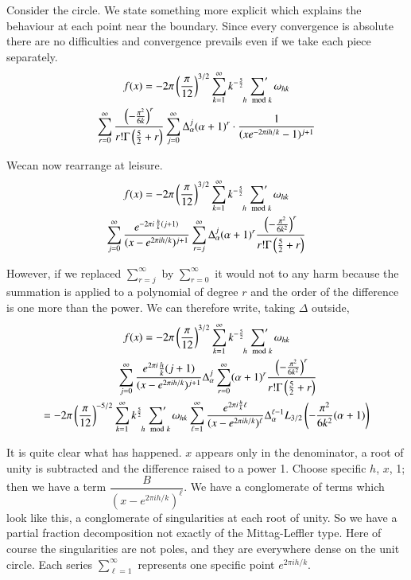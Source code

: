 Consider the circle. We state something more explicit which explains
the behaviour at each point near the boundary. Since every convergence
is absolute there are no difficulties and convergence prevails even if
we take each piece separately. 
\begin{multline*}
  f(x) =- 2 \pi \left( \frac{\pi}{12}\right)^{3/2} \sum^\infty_{k=1}
  k^{-\frac{5}{2}} \sideset{}{'}\sum_{h \mod k} \omega_{hk} \\
  \sum^\infty_{r=0} \frac{\left(- \frac{\pi^2}{6k} \right)^r}{r!
    \Gamma \left( \frac{5}{2}+ r\right)} \sum^\infty_{j=0}
  \Delta_\alpha^j (\alpha+1)^r \cdot \frac{1}{(x e^{-2 \pi i h/k}-1)^{j+1}}
\end{multline*}

We\pageoriginale can now rearrange at leisure.
\begin{multline*}
  f(x) =- 2 \pi \left( \frac{\pi}{12}\right)^{3/2} \sum^\infty_{k=1}
  k^{-\frac{5}{2}} \sideset{}{'}\sum_{h \mod k} \omega_{hk} \\
  \sum^\infty_{j=0} \frac{e^{-2 \pi i \, \frac{h}{k}(j+1)}}{(x-e^{2 \pi i
      h/k})^{j+1}} \sum^\infty_{r=j} \Delta^j_\alpha (\alpha+ 1)^r
  \frac{\left( - \frac{\pi^2}{6k^2}\right)^r}{r! \Gamma \left(
    \frac{5}{2} + r\right)} 
\end{multline*}

However, if we replaced $\sum^\infty_{r=j}$ by $\sum^\infty_{r=0}$
it would not to any harm because the summation is applied to a
polynomial of degree $r$ and the order of the difference is one more
than the power. We can therefore write, taking $\Delta$ outside, 
\begin{multline*}
  f (x)  = - 2 \pi \left(\frac{\pi}{12}\right)^{3/2} \sum^\infty_{k=1}
  k^{-\frac{5}{2}} \sideset{}{'}\sum_{h \mod k} \omega_{hk} \\
   \qquad\sum^\infty_{j=0} \frac{e^{2 \pi i} \frac{h}{k}(j+1)}{(x-e^{2 \pi i
      h/k})^{j+1}}  \Delta^j_\alpha \sum^\infty_{r=0}(\alpha+ 1)^r
  \frac{\left( - \frac{\pi^2}{6k^2}\right)^r}{r! \Gamma \left(
    \frac{5}{2} + r\right)}\\
   = -2 \pi \left( \frac{\pi}{12}\right)^{-5/2} \sum^\infty_{k=1}
  k^{\frac{5}{2}} \sideset{}{'}\sum_{h \mod k} \omega_{hk} \sum^\infty_{\ell=1}
  \frac{e^{2 \pi i \frac{h}{k} \ell}}{(x- e^{2 \pi i h/k})^\ell}
  \Delta_\alpha^{\ell-1} L_{3/2} \left(- \frac{\pi^2}{6k^2} (\alpha+1) \right)
\end{multline*}
 
It is quite clear what has happened. $x$ appears only in the
denominator, a root of unity is subtracted and the difference raised\pageoriginale
to a power 1. Choose specific $h$, $x$, 1; then we have a term
$\dfrac{B}{(x- e^{2 \pi i h/k})^\ell}$. We have a conglomerate of
terms which look like this, a conglomerate of singularities at each
root of unity. So we have a partial fraction decomposition not
exactly of the Mittag-Leffler type. Here of course the singularities
are not poles, and they are everywhere dense on the unit circle. Each
series $\sum\limits^\infty_{\ell =1}$ represents one specific point
$e^{2 \pi i h/k}$. 

